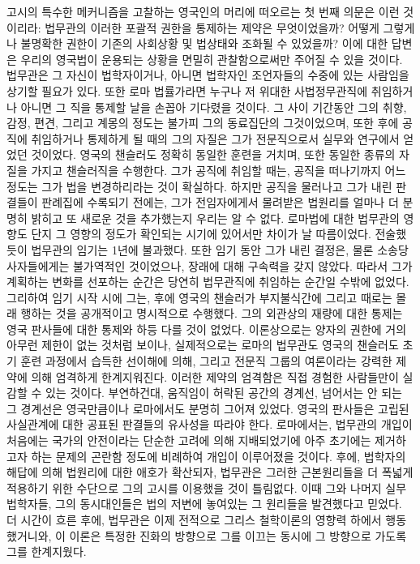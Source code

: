 고시의 특수한 메커니즘을 고찰하는 영국인의 머리에 떠오르는
첫 번째 의문은 이런 것이리라: 법무관의 이러한 포괄적 권한을 통제하는
제약은 무엇이었을까? 어떻게 그렇게나 불명확한 권한이
기존의 사회상황 및 법상태와 조화될 수 있었을까?
이에 대한 답변은 우리의 영국법이 운용되는 상황을 면밀히 관찰함으로써만
주어질 수 있을 것이다.
법무관은 그 자신이 법학자이거나, 아니면 법학자인 조언자들의 수중에 있는
사람임을 상기할 필요가 있다.
또한 로마 법률가라면 누구나 저 위대한 사법정무관직에 취임하거나 아니면
그 직을 통제할 날을 손꼽아 기다렸을 것이다.
그 사이 기간동안 그의 취향, 감정, 편견, 그리고 계몽의 정도는
불가피 그의 동료집단의 그것이었으며,
또한 후에 공직에 취임하거나 통제하게 될 때의 그의 자질은
그가 전문직으로서 실무와 연구에서 얻었던 것이었다.
영국의 챈슬러도 정확히 동일한 훈련을 거치며, 또한 동일한 종류의 자질을 가지고
챈슬러직을 수행한다.
그가 공직에 취임할 때는, 공직을 떠나기까지 어느 정도는
그가 법을 변경하리라는 것이 확실하다.
하지만 공직을 물러나고 그가 내린 판결들이 판례집에 수록되기
전에는, 그가 전임자에게서 물려받은 법원리를 얼마나 더 분명히 밝히고
또 새로운 것을 추가했는지 우리는 알 수 없다.
로마법에 대한 법무관의 영향도 단지 그 영향의 정도가 확인되는 시기에 있어서만
차이가 날 따름이었다.
전술했듯이 법무관의 임기는 1년에 불과했다.
또한 임기 동안 그가 내린 결정은, 물론 소송당사자들에게는 불가역적인 것이었으나,
장래에 대해 구속력을 갖지 않았다.
따라서 그가 계획하는 변화를 선포하는 순간은 당연히
법무관직에 취임하는 순간일 수밖에 없었다.
그리하여 임기 시작 시에 그는,
후에 영국의 챈슬러가 부지불식간에 그리고 때로는 몰래 행하는 것을
공개적이고 명시적으로 수행했다.
그의 외관상의 재량에 대한 통제는 영국 판사들에 대한 통제와
하등 다를 것이 없었다.
이론상으로는 양자의 권한에 거의 아무런 제한이 없는 것처럼 보이나,
실제적으로는 로마의 법무관도 영국의 챈슬러도
초기 훈련 과정에서 습득한 선이해에 의해, 그리고
전문직 그룹의 여론이라는 강력한 제약에 의해
엄격하게 한계지워진다.
이러한 제약의 엄격함은 직접 경험한 사람들만이 실감할 수 있는 것이다.
부연하건대, 움직임이 허락된 공간의 경계선, 넘어서는 안 되는 그 경계선은
영국만큼이나 로마에서도 분명히 그어져 있었다.
영국의 판사들은 고립된 사실관계에 대한 공표된 판결들의 유사성을 따라야 한다.
로마에서는, 법무관의 개입이 처음에는 국가의 안전이라는 단순한 고려에 의해
지배되었기에 아주 초기에는 제거하고자 하는 문제의 곤란함 정도에 비례하여
개입이 이루어졌을 것이다.
후에, 법학자의 해답에 의해 법원리에 대한 애호가 확산되자,
법무관은 그러한 근본원리들을 더 폭넓게
적용하기 위한 수단으로 그의 고시를 이용했을 것이 틀림없다.
이때 그와 나머지 실무 법학자들, 그의 동시대인들은
법의 저변에 놓여있는 그 원리들을 발견했다고 믿었다.
더 시간이 흐른 후에,
법무관은 이제 전적으로 그리스 철학이론의 영향력 하에서
행동했거니와, 이 이론은 특정한 진화의 방향으로 그를 이끄는 동시에
그 방향으로 가도록 그를 한계지웠다.

